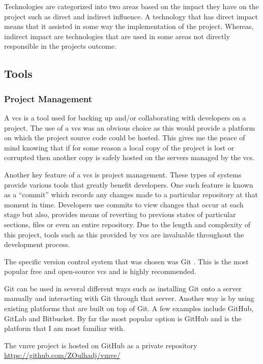 \documentclass[11pt]{article}
\begin{document}
Technologies are categorized into two areas based on the impact they have on the
project such as direct and indirect influence. A technology that has direct
impact means that it assisted in some way the implementation of the project.
Whereas, indirect impact are technologies that are used in some areas not
directly responsible in the projects outcome.


\subsection{Tools}


\subsubsection{Project Management}
A \gls{vcs} is a tool used for backing up and/or collaborating with developers
on a project. The use of a \gls{vcs} was an obvious choice as this would provide
a platform on which the project source code could be hosted. This gives me the
peace of mind knowing that if for some reason a local copy of the project is
lost or corrupted then another copy is safely hosted on the servers managed by
the \gls{vcs}.

Another key feature of a \gls{vcs} is project management. These types of systems
provide various tools that greatly benefit developers. One such feature is known
as a ``commit'' which records any changes made to a particular repository at
that moment in time. Developers use commits to view changes that occur at each
stage but also, provides means of reverting to previous states of particular
sections, files or even an entire repository. Due to the length and complexity
of this project, tools such as this provided by \gls{vcs} are invaluable throughout
the development process.

The specific version control system that was chosen was Git \cite{gitvcs}. This
is the most popular free and open-source \gls{vcs} and is highly recommended.

Git can be used in several different ways such as installing Git onto a server
manually and interacting with Git through that server. Another way is by using
existing platforms that are built on top of Git. A few examples include GitHub,
GitLab and Bitbucket. By far the most popular option is GitHub and is the
platform that I am most familiar with.


The \gls{vmve} project is hosted on GitHub as a private repository
\url{https://github.com/ZOulhadj/vmve/}
\end{document}
